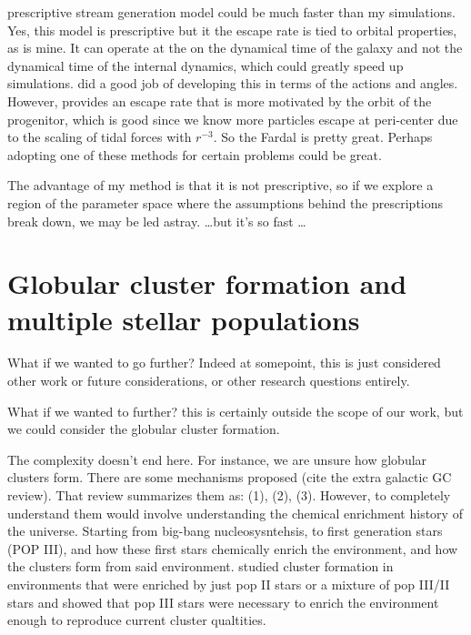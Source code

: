 \citet{2015MNRAS.452..301F} prescriptive stream generation model could be much faster than my simulations. Yes, this model is prescriptive but it the escape rate is tied to orbital properties, as is mine. It can operate at the on the dynamical time of the galaxy and not the dynamical time of the internal dynamics, which could greatly speed up simulations. \citet{2014ApJ...795...95B} did a good job of developing this in terms of the actions and angles. However, \citet{2015MNRAS.452..301F} provides an escape rate that is more motivated by the orbit of the progenitor, which is good since we know more particles escape at peri-center due to the scaling of tidal forces with $r^{-3}$. So the Fardal is pretty great. Perhaps adopting one of these methods for certain problems could be great. 

The advantage of my method is that it is not prescriptive, so if we explore a region of the parameter space where the assumptions behind the prescriptions break down, we may be led astray. \dots but it's so fast \dots 



\section{Globular cluster formation and multiple stellar populations}

    What if we wanted to go further? Indeed at somepoint, this is just considered other work or future considerations, or other research questions entirely. 

    What if we wanted to further? this is certainly outside the scope of our work, but we could consider the globular cluster formation. 

    The complexity doesn't end here. For instance, we are unsure how globular clusters form. There are some mechanisms proposed (cite the extra galactic GC review). That review summarizes them as: (1), (2), (3). However, to completely understand them would involve understanding the chemical enrichment history of the universe. Starting from big-bang nucleosysntehsis, to first generation stars (POP III), and how these first stars chemically enrich the environment, and how the clusters form from said environment. \citet{2022A&A...668A.191C} studied cluster formation in environments that were enriched by just pop II stars or a mixture of pop III/II stars and showed that pop III stars were necessary to enrich the environment enough to reproduce current cluster qualtities. 

